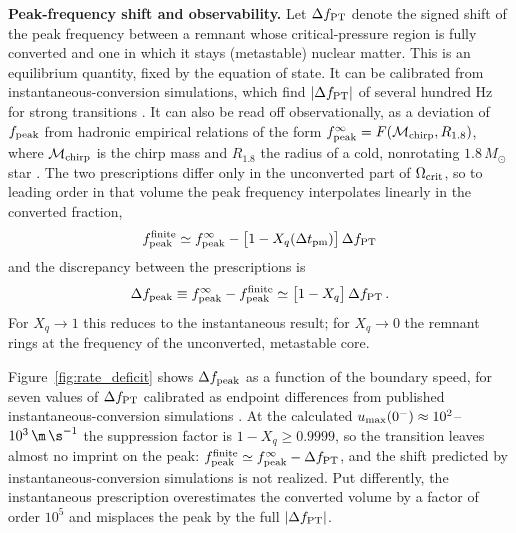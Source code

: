 \textbf{Peak-frequency shift and observability.}
Let $\Delta f_{\rm PT}$ denote the signed shift of the peak frequency between a remnant whose critical-pressure region is fully converted and one in which it stays (metastable) nuclear matter.
This is an equilibrium quantity, fixed by the equation of state.
It can be calibrated from instantaneous-conversion simulations, which find $|\Delta f_{\rm PT}|$ of several hundred Hz for strong transitions \cite{Bauswein:2018bma,Most:2018eaw,Weih:2019xvw}.
It can also be read off observationally, as a deviation of $f_{\rm peak}$ from hadronic empirical relations of the form $f_{\rm peak}^{\infty}=F(\mathcal{M}_{\rm chirp},R_{1.8})$, where $\mathcal{M}_{\rm chirp}$ is the chirp mass and $R_{1.8}$ the radius of a cold, nonrotating $1.8\,M_\odot$ star \cite{Bauswein:2012ya,Vretinaris:2019spn}.
The two prescriptions differ only in the unconverted part of $\Omega_{\rm crit}$, so to leading order in that volume the peak frequency interpolates linearly in the converted fraction,
\begin{equation}
f_{\rm peak}^{\rm finite}
\simeq
f_{\rm peak}^{\infty}
-\bigl[1-X_q(\Delta t_{\rm pm})\bigr]\,
\Delta f_{\rm PT}
\label{eq:finite_peak_frequency}
\end{equation}
and the discrepancy between the prescriptions is
\begin{equation}
\Delta f_{\rm peak}
\equiv
f_{\rm peak}^{\infty}-f_{\rm peak}^{\rm finite}
\simeq
\bigl[1-X_q\bigr]\,\Delta f_{\rm PT}\,.
\label{eq:rate_shift}
\end{equation}
For $X_q\to1$ this reduces to the instantaneous result; for $X_q\to0$ the remnant rings at the frequency of the unconverted, metastable core.

Figure~\ref{fig:rate_deficit} shows $\Delta f_{\rm peak}$ as a function of the boundary speed, for seven values of $\Delta f_{\rm PT}$ calibrated as endpoint differences from published instantaneous-conversion simulations \cite{Prakash:2023afe,Bauswein:2018bma}.
At the calculated $u_{\rm max}(0^-)\approx10^{2}$--$10^{3}\,\m\,\s^{-1}$ the suppression factor is $1-X_q\geq0.9999$, so the transition leaves almost no imprint on the peak: $f_{\rm peak}^{\rm finite}\simeq f_{\rm peak}^{\infty}-\Delta f_{\rm PT}$, and the shift predicted by instantaneous-conversion simulations is not realized.
Put differently, the instantaneous prescription overestimates the converted volume by a factor of order $10^{5}$ and misplaces the peak by the full $|\Delta f_{\rm PT}|$.

